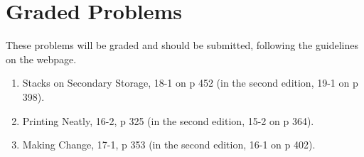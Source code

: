 \documentclass[11pt]{article}
\begin{document}
\section*{Graded Problems}

These problems will be graded and should be submitted, following the
guidelines on the webpage.

\begin{enumerate}
    \item Stacks on Secondary Storage, 
	18-1 on p 452 (in the second edition, 19-1 on p 398).
    \item Printing Neatly, 16-2, p 325
	(in the second edition, 15-2 on p 364).
    \item Making Change, 17-1, p 353
	(in the second edition, 16-1 on p 402).
\end{enumerate}
\end{document}
